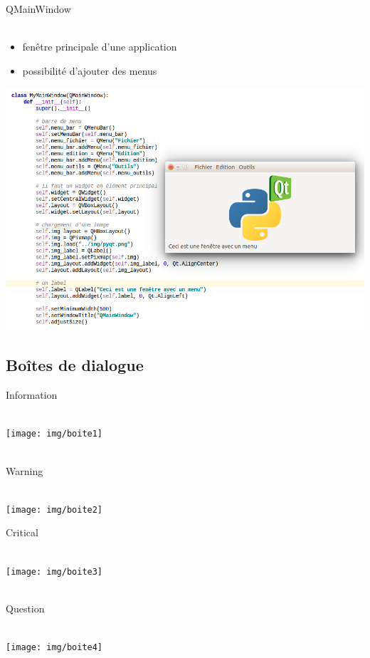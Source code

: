 \documentclass[9pt, french, brown]{beamer}
\newcommand{\mytitle}[1]{{\color{brown}#1 \\~\\}}
\begin{document}
\begin{frame}{\secname}{\subsecname}
\mytitle{QMainWindow}
\begin{itemize}
\item fenêtre principale d\rq{}une application
\item possibilité d\rq{}ajouter des menus
\end{itemize}
\begin{center}\includegraphics[scale=0.25]{img/window2_1}\end{center}
\end{frame}


\subsection{Boîtes de dialogue\label{boites_dialogue}}

\begin{frame}{\secname}{\subsecname}
\mytitle{Information}
\begin{center}\texttt{[image: img/boite1]}\end{center}
~\\
\mytitle{Warning}
\begin{center}\texttt{[image: img/boite2]}\end{center}
\end{frame}

\begin{frame}{\secname}{\subsecname}
\mytitle{Critical}
\begin{center}\texttt{[image: img/boite3]}\end{center}
~\\
\mytitle{Question}
\begin{center}\texttt{[image: img/boite4]}\end{center}
\end{frame}
\end{document}
